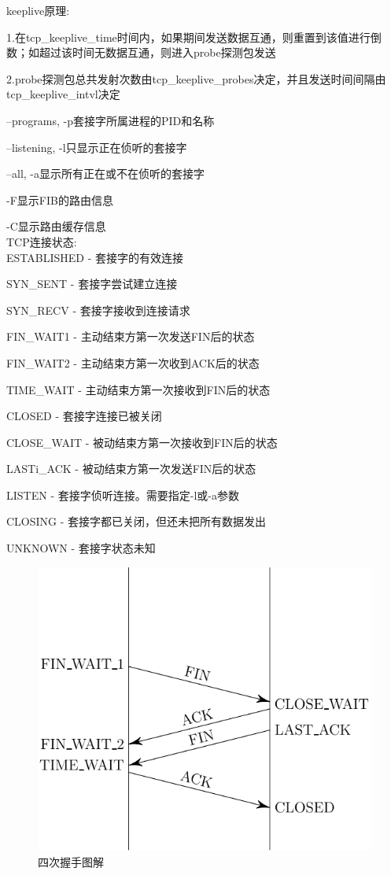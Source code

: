 \documentclass[UTF8,fontset=ubuntu]{ctexart}
\begin{document}
\qquad keeplive原理:\par
\qquad 1.在tcp\_keeplive\_time时间内，如果期间发送数据互通，则重置到该值进行倒数；如超过该时间无数据互通，则进入probe探测包发送\par
\qquad 2.probe探测包总共发射次数由tcp\_keeplive\_probes决定，并且发送时间间隔由tcp\_keeplive\_intvl决定\par

--programs, -p\quad 套接字所属进程的PID和名称

--listening, -l\quad 只显示正在侦听的套接字

--all, -a\quad 显示所有正在或不在侦听的套接字

-F\quad 显示FIB的路由信息

-C\quad 显示路由缓存信息\\[1ex]


TCP连接状态:\\
ESTABLISHED - 套接字的有效连接

SYN\_SENT - 套接字尝试建立连接

SYN\_RECV - 套接字接收到连接请求

FIN\_WAIT1 - 主动结束方第一次发送FIN后的状态

FIN\_WAIT2 - 主动结束方第一次收到ACK后的状态

TIME\_WAIT - 主动结束方第一次接收到FIN后的状态

CLOSED - 套接字连接已被关闭

CLOSE\_WAIT - 被动结束方第一次接收到FIN后的状态
 
LASTi\_ACK - 被动结束方第一次发送FIN后的状态

LISTEN - 套接字侦听连接。需要指定-l或-a参数

CLOSING - 套接字都已关闭，但还未把所有数据发出

UNKNOWN - 套接字状态未知
\begin{figure}
	\includegraphics{four_handshake.pdf}
	\caption{四次握手图解}
\end{figure}
\end{document}
